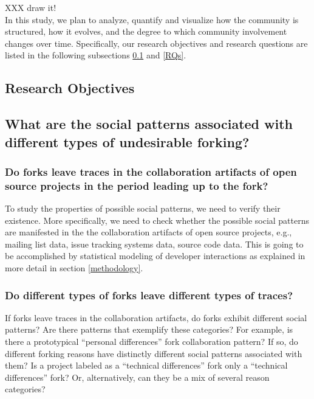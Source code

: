 \documentclass[11pt]{report}
\begin{document}
XXX draw it!\\

In this study, we plan to analyze, quantify and visualize how the community is structured, how it evolves, and the degree to which community involvement changes over time.
Specifically, our research objectives and research questions are listed in the following subsections \ref{ResearchObjective} and \ref{RQs}.

\subsection{Research Objectives}
\label{ResearchObjective}
\subsection*{What are the social patterns associated with different types of undesirable forking?\\}

\subsubsection{\hspace{4 mm} Do forks leave traces in the collaboration artifacts of open source projects in the period leading up to the fork?\\}

To study the properties of possible social patterns, we need to verify their existence. More specifically, we need to check whether the possible social patterns are manifested in the the collaboration artifacts of open source projects, e.g., mailing list data, issue tracking systems data, source code data. This is going to be accomplished by statistical modeling of developer interactions as explained in more detail in section \ref{methodology}.

\subsubsection{\hspace{4 mm} Do different types of forks leave different types of traces?\\}

If forks leave traces in the collaboration artifacts, do forks exhibit different social patterns? Are there patterns that exemplify these categories? For example, is there a prototypical ``personal differences'' fork collaboration pattern? If so, do different forking reasons have distinctly different social patterns associated with them? Is a project labeled as a ``technical differences'' fork only a ``technical differences'' fork? Or, alternatively, can they be a mix of several reason categories?
\end{document}
